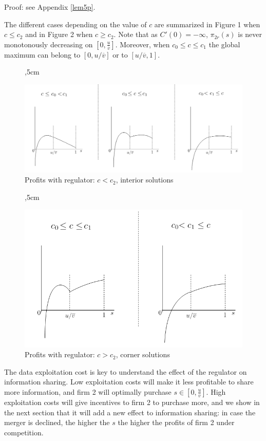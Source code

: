 \documentclass[a4paper,leqno]{article}%
\newcommand{\ov}{\overline{v}}
\begin{document}
\noindent Proof: see Appendix \ref{lem5p}.

\noindent The different cases depending on the value of $c$ are summarized in Figure 1 when $c\leq c_2$ and in Figure 2 when $c\geq c_2$. Note that as $C'(0)=-\infty$, $\pi_{2r}(s)$ is never monotonously decreasing on $[0,\frac{u}{\ov}]$. Moreover, when $c_0\leq c\leq c_1$ the global maximum can belong to $[0,u/\ov]$ or to $[u/\ov,1]$. 

\medskip

\begin{figure}[H]
,5cm{
\includegraphics[scale=0.55]{Figure1}
\caption{Profits with regulator: $c<c_2$, interior solutions}\label{Figure1}}
\end{figure}


\begin{figure}[H]
,5cm{
\includegraphics[scale=0.55]{Figure2}
\caption{Profits with regulator: $c>c_2$, corner solutions}\label{Figure2}}
\end{figure}

\medskip

The data exploitation cost is key to understand the effect of the regulator on information sharing. Low exploitation costs will make it less profitable to share more information, and firm 2 will optimally purchase $s\in[0,\frac{u}{\ov}]$. High exploitation costs will give incentives to firm 2 to purchase more, and we show in the next section that it will add a new effect to information sharing: in case the merger is declined, the higher the $s$ the higher the profits of firm 2 under competition.
\end{document}
